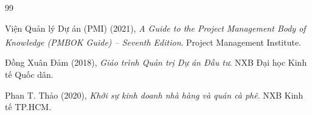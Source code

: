 \documentclass[a4paper,12pt]{article}
\begin{document}
\clearpage
\renewcommand{\refname}{Tài liệu tham khảo}
\begin{thebibliography}{99}

Viện Quản lý Dự án (PMI) (2021),
\textit{A Guide to the Project Management Body of Knowledge (PMBOK\textsuperscript{\textregistered} Guide) -- Seventh Edition}.
Project Management Institute.

Đồng Xuân Đảm (2018),
\textit{Giáo trình Quản trị Dự án Đầu tư}.
NXB Đại học Kinh tế Quốc dân.

Phan T. Thảo (2020),
\textit{Khởi sự kinh doanh nhà hàng và quán cà phê}.
NXB Kinh tế TP.HCM.

\end{thebibliography}
\end{document}
